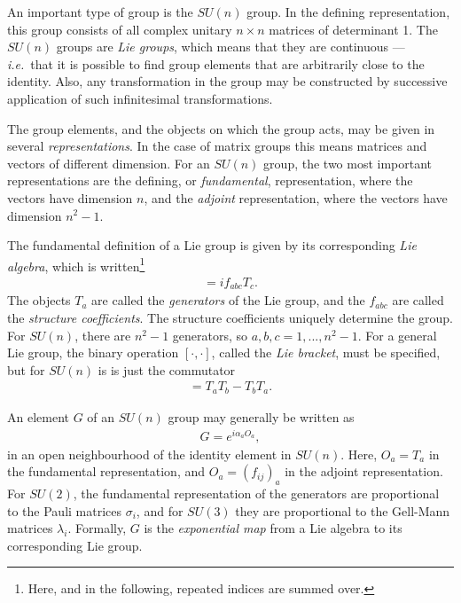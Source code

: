 \documentclass[twoside,english]{uiofysmaster}
\begin{document}
An important type of group is the $SU(n)$ group. In the defining representation, this group consists of all complex unitary $n\times n$ matrices of determinant 1. The $SU(n)$ groups are {\it Lie groups}, which means that they are continuous --- {\it i.e.}\ that it is possible to find group elements that are arbitrarily close to the identity. Also, any transformation in the group may be constructed by successive application of such infinitesimal transformations. 

The group elements, and the objects on which the group acts, may be given in several {\it representations}. In the case of matrix groups this means matrices and vectors of different dimension. For an $SU(n)$ group, the two most important representations are the defining, or {\it fundamental}, representation, where the vectors have dimension $n$, and the {\it adjoint} representation, where the vectors have dimension $n^2-1$.

The fundamental definition of a Lie group is given by its corresponding {\it Lie algebra}, which is written\footnote{Here, and in the following, repeated indices are summed over.} 
\begin{align}
	[T_a, T_b] = i f_{abc}T_c.
\end{align}
The objects $T_a$ are called the {\it generators} of the Lie group, and the $f_{abc}$ are called the {\it structure coefficients}. The structure coefficients uniquely determine the group. For $SU(n)$, there are $n^2 - 1$ generators, so $a,b,c =1,...,n^2-1$. For a general Lie group, the binary operation $[\cdot , \cdot ]$, called the {\it Lie bracket}, must be specified, but for $SU(n)$ is is just the commutator
\begin{align}
	[T_a, T_b] = T_aT_b - T_bT_a.
\end{align}

An element $G$ of an $SU(n)$ group may generally be written as
\begin{align}
	G = e^{i\alpha_a O_a},\label{eq:global_gauge_transformation}
\end{align}
in an open neighbourhood of the identity element in $SU(n)$. Here, $O_a = T_a$ in the fundamental representation, and $O_a = (f_{ij})_{a}$ in the adjoint representation. For $SU(2)$, the fundamental representation of the generators are proportional to the Pauli matrices $\sigma_i$, and for $SU(3)$ they are proportional to the Gell-Mann matrices $\lambda_i$. Formally, $G$ is the {\it exponential map} from a Lie algebra to its corresponding Lie group. 
\end{document}
